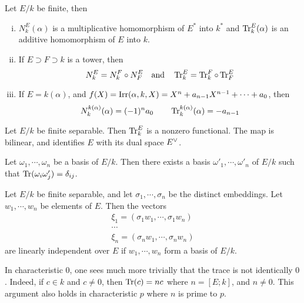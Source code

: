   \begin{thm}
    Let $E/k$ be finite, then
    \begin{enumerate}[(i)]
      \item $N^E_k(\alpha)$ is a multiplicative homomorphism of $E^{\ast}$ into $k^{\ast}$ and  $\operatorname{Tr}^E_k(\alpha)$ is an additive homomorphism of $E$ into $k$.
      \item If $E\supset F\supset k$ is a tower, then
                 \begin{equation*}
                   N^E_k=N^F_k\circ N^E_F\quad\text{and}\quad \operatorname{Tr}^E_k=\operatorname{Tr}^F_k\circ\operatorname{Tr}^E_F
                 \end{equation*}
      \item If $E=k(\alpha)$, and $f(X)=\operatorname{Irr}(\alpha,k,X)=X^n+a_{n-1}X^{n-1}+\cdots+a_0$, then
                 \begin{equation*}
                   N^{k(\alpha)}_k(\alpha)=(-1)^na_0\quad\text\quad\operatorname{Tr}^{k(\alpha)}_k(\alpha)=-a_{n-1}
                 \end{equation*}
    \end{enumerate}
  \end{thm}

  \begin{thm}
    Let $E/k$ be finite separable. Then $\operatorname{Tr}^E_k$ is a nonzero functional. The map
    is bilinear, and identifies $E$ with its dual space ${E}^{\vee}$.
  \end{thm}

  \begin{cor}
    Let $\omega_1,\cdots,\omega_n$ be a basis of $E/k$. Then there exists a basis $\omega'_1,\cdots,\omega'_n$ of $E/k$ such that $\operatorname{Tr}(\omega_i\omega'_j)=\delta_{ij}$.
  \end{cor}

  \begin{cor}
    Let $E/k$ be finite separable, and let $\sigma_1,\cdots,\sigma_n$ be the distinct embeddings. Let $w_1,\cdots,w_n$ be elements of $E$. Then the vectors
    \begin{gather*}
      \xi_1=(\sigma_1w_1,\cdots,\sigma_1w_n) \\
      \cdots \\
      \xi_n=(\sigma_nw_1,\cdots,\sigma_nw_n)
    \end{gather*}
    are linearly independent over $E$ if $w_1,\cdots,w_n$ form a basis of $E/k$.
  \end{cor}

  \begin{rem}
    In characteristic $0$, one sees much more trivially that the trace is not identically $0$. Indeed, if $c\in k$ and $c\neq0$, then $\operatorname{Tr}(c)=nc$ where $n=[E;k]$, and $n\neq0$. This argument also holds in characteristic $p$ where $n$ is prime to $p$.
  \end{rem}

